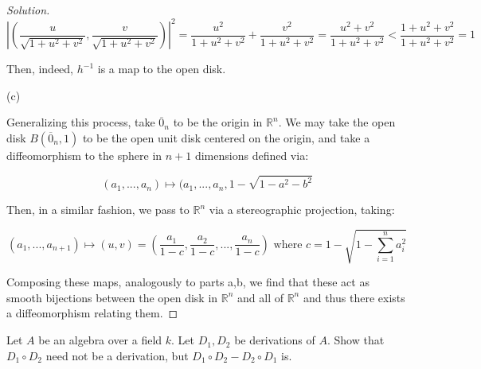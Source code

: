\documentclass[10pt]{article}
\newenvironment{problem}[2][]{\begin{trivlist}
\item[\hskip \labelsep {\bfseries #1}\hskip \labelsep {\bfseries #2.}]}{\end{trivlist}}
\begin{document}
\begin{proof}[Solution]
$$\left| \left(\frac{u}{\sqrt{1 + u^2 + v^2}}, \frac{v}{\sqrt{1 + u^2 + v^2}} \right) \right|^2 = \frac{u^2}{1 + u^2 + v^2} + \frac{v^2} {1 + u^2 + v^2}  = \frac{u^2 + v^2}{1 + u^2 + v^2} < \frac{1 + u^2 + v^2}{ 1 + u^2 + v^2} = 1 $$

Then, indeed, $h^{-1}$ is a map to the open disk.

(c)

Generalizing this process, take $\overline{0}_n$ to be the origin in $\mathbb{R}^n$. We may take the open disk $B(\overline{0}_n, 1)$ to be the open unit disk centered on the origin, and take a diffeomorphism to the sphere in $n+1$ dimensions defined via:

$$ (a_1,...,a_n) \mapsto (a_1,...,a_n, 1 - \sqrt{1 - a^2 - b^2} $$

Then, in a similar fashion, we pass to $\mathbb{R}^n$ via a stereographic projection, taking:

$$(a_1,...,a_{n+1}) \mapsto (u,v) = \left( \frac{a_1}{1-c}, \frac{a_2}{1-c}, ..., \frac{a_n}{ 1-c } \right) \text{ where } c = 1 - \sqrt{ 1 - \sum_{i=1}^n a_i^2 } $$ 

Composing these maps, analogously to parts a,b, we find that these act as smooth bijections between the open disk in $\mathbb{R}^n$ and all of $\mathbb{R}^n$ and thus there exists a diffeomorphism relating them.

\end{proof}

\begin{problem}{Question 3}

Let $A$ be an algebra over a field $k$. Let $D_1, D_2$ be derivations of $A$. Show that $D_1 \circ D_2$ need not be a derivation, but $D_1 \circ D_2 - D_2 \circ D_1$ is.

\end{problem}
\end{document}

